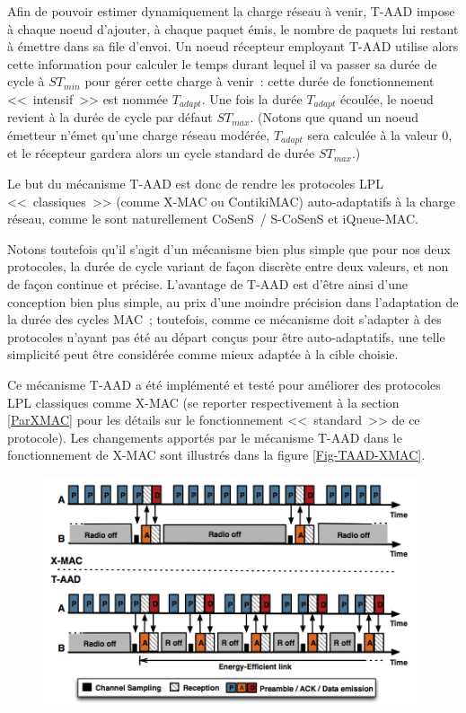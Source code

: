 Afin de pouvoir estimer dynamiquement la charge réseau à venir, T-AAD
impose à chaque noeud d'ajouter, à chaque paquet émis, le nombre de paquets
lui restant à émettre dans sa file d'envoi. Un noeud récepteur employant
T-AAD utilise alors cette information pour calculer le temps durant lequel
il va passer sa durée de cycle à $ST_{min}$ pour gérer cette charge à venir~:
cette durée de fonctionnement <<~intensif~>> est nommée $T_{adapt}$.
Une fois la durée $T_{adapt}$ écoulée, le noeud revient à la durée de cycle
par défaut $ST_{max}$. (Notons que quand un noeud émetteur n'émet qu'une
charge réseau modérée, $T_{adapt}$ sera calculée à la valeur 0, et
le récepteur gardera alors un cycle standard de durée $ST_{max}$.)

Le but du mécanisme T-AAD est donc de rendre les protocoles LPL
<<~classiques~>> (comme X-MAC ou ContikiMAC) auto-adaptatifs à la charge
réseau, comme le sont naturellement CoSenS~/ S-CoSenS et iQueue-MAC.

Notons toutefois qu'il s'agit d'un mécanisme bien plus simple que pour
nos deux protocoles, la durée de cycle variant de façon discrète entre
deux valeurs, et non de façon continue et précise. L'avantage de T-AAD
est d'être ainsi d'une conception bien plus simple, au prix d'une
moindre précision dans l'adaptation de la durée des cycles MAC~;
toutefois, comme ce mécanisme doit s'adapter à des protocoles n'ayant
pas été au départ conçus pour être auto-adaptatifs, une telle simplicité
peut être considérée comme mieux adaptée à la cible choisie.

\medskip

Ce mécanisme T-AAD a été implémenté et testé pour améliorer des
protocoles LPL classiques comme X-MAC \cite{T-AAD} \cite{T-AAD-demo}
(se reporter respectivement à la section \vref{ParXMAC} pour les détails
sur le fonctionnement <<~standard~>> de ce protocole). Les changements
apportés par le mécanisme T-AAD dans le fonctionnement de X-MAC sont
illustrés dans la figure \vref{Fig-TAAD-XMAC}.

\begin{figure}[!htb]
\centering
\includegraphics[width=11cm]{images/ch3-t-aad-x-mac.png}
\label{Fig-TAAD-XMAC}
\end{figure}


